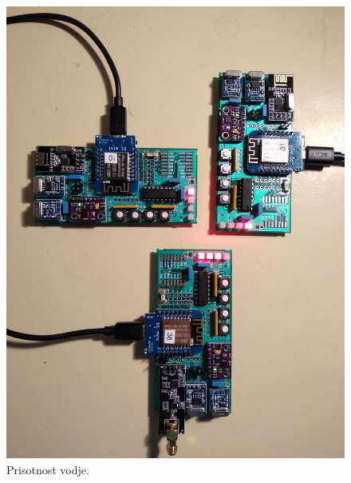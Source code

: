 \documentclass[runningheads]{llncs}
\begin{document}
\begin{figure}
  \includegraphics[width=\linewidth]{one_leader.jpg}
  \caption{Prisotnost vodje.}
  \label{fig:one_leader}
\end{figure}
\end{document}
